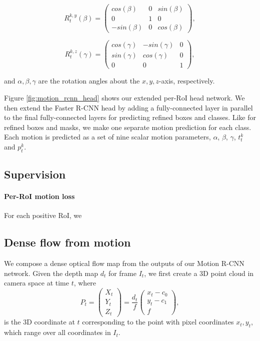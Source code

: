\begin{equation}
R_t^{k,y}(\beta) =
\begin{pmatrix}
  cos(\beta) & 0 & sin(\beta) \\
  0 & 1 & 0 \\
  -sin(\beta) & 0 & cos(\beta)
\end{pmatrix},
\end{equation}

\begin{equation}
R_t^{k,z}(\gamma) =
\begin{pmatrix}
  cos(\gamma) & -sin(\gamma) & 0 \\
  sin(\gamma) & cos(\gamma) & 0 \\
  0 & 0 & 1
\end{pmatrix},
\end{equation}

and $\alpha, \beta, \gamma$ are the rotation angles about the $x,y,z$-axis, respectively.


Figure \ref{fig:motion_rcnn_head} shows our extended per-RoI head network.
We then extend the Faster R-CNN head by adding a fully-connected layer in parallel to the final fully-connected layers for
predicting refined boxes and classes.
Like for refined boxes and masks, we make one separate motion prediction for each class.
Each motion is predicted as a set of nine scalar motion parameters, $\alpha$, $\beta$, $\gamma$, $t_t^k$ and $p_t^k$.


\subsection{Supervision}

\paragraph{Per-RoI motion loss}
For each positive RoI, we



\subsection{Dense flow from motion}
We compose a dense optical flow map from the outputs of our Motion R-CNN network.
Given the depth map $d_t$ for frame $I_t$, we first create a 3D point cloud in camera space at time $t$,
where
\begin{equation}
P_t =
\begin{pmatrix}
X_t \\ Y_t \\ Z_t
\end{pmatrix}
=
\frac{d_t}{f}
\begin{pmatrix}
x_t - c_0 \\ y_t - c_1 \\ f
\end{pmatrix},
\end{equation}
is the 3D coordinate at $t$ corresponding to the point with pixel coordinates $x_t, y_t$,
which range over all coordinates in $I_t$.

